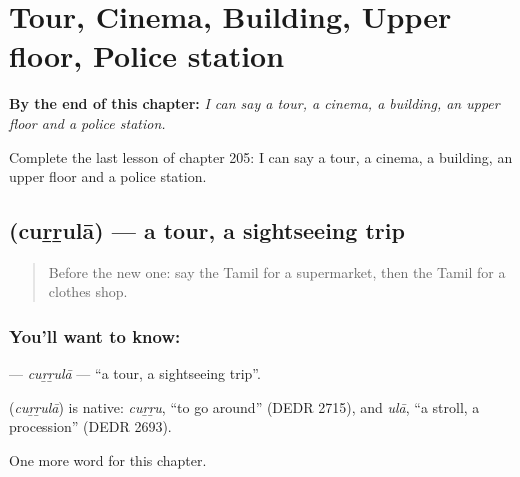 
\chapter{Tour, Cinema, Building, Upper floor, Police station}
\label{ch:ta-tour-cinema-building-upper-floor-police-station}

\begin{chapteropening}
\textbf{By the end of this chapter:} \emph{I can say a tour, a cinema, a building, an upper floor and a police station.}

Complete the last lesson of chapter 205: I can say a tour, a cinema, a building, an upper floor and a police station.
\end{chapteropening}

\section[\texorpdfstring{\ta{சுற்றுலா} (cuṟṟulā)}{சுற்றுலா (cuṟṟulā)}]{ (cuṟṟulā) — a tour, a sightseeing trip}

\label{lesson:TA-C205-currula}



\begin{quote}
Before the new one: say the Tamil for a supermarket, then the Tamil for a clothes shop.
\end{quote}

\subsection*{You'll want to know: }
\textbf{} — \emph{cuṟṟulā} — \textquotedblleft{}a tour, a sightseeing trip\textquotedblright{}.

\begin{cousinweb}
\textbf{} (\emph{cuṟṟulā}) is native: \emph{cuṟṟu}, \textquotedblleft{}to go around\textquotedblright{} (DEDR 2715), and \emph{ulā}, \textquotedblleft{}a stroll, a procession\textquotedblright{} (DEDR 2693).
\end{cousinweb}

\begin{grammarlens}[title={What you've built}]
One more word for this chapter.
\end{grammarlens}

